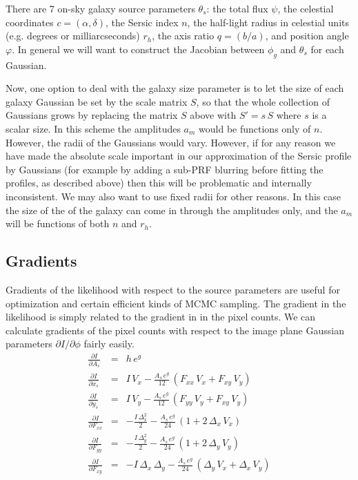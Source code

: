 \documentclass[modern]{aastex62}
\newcommand{\dx}{\Delta_x}
\newcommand{\dy}{\Delta_y}
\begin{document}
{There are 7 on-sky galaxy source parameters $\theta_s$:
the total flux $\psi$,
the celestial coordinates $c= (\alpha, \delta)$,
the Sersic index $n$, 
the half-light radius in  celestial units (e.g. degrees or milliarcseconds) $r_h$,
the axis ratio $q = (b/a)$,
and position angle $\varphi$.
In general we will want to construct the Jacobian between $\phi_g$ and $\theta_s$ for each Gaussian.

Now, one option to deal with the galaxy size parameter is to let the size of each galaxy Gaussian be set by the scale matrix $S$, so that the whole collection of Gaussians grows by replacing the matrix $S$ above with $S'=s\,S$ where $s$ is a scalar size.
In this scheme the amplitudes $a_m$ would be functions only of $n$.
However, the radii of the Gaussians would vary.
However, if for any reason we have made the absolute scale important in our approximation of the Sersic profile by Gaussians (for example by adding a sub-PRF blurring before fitting the profiles, as described above) then this will be problematic and internally inconsistent.
We may also want to use fixed radii for other reasons.
In this case the size of the of the galaxy can come in through the amplitudes only, and the $a_m$ will be functions of both $n$ and $r_h$.


\subsection{Gradients}
Gradients of the likelihood with respect to the source parameters are useful for optimization and certain efficient kinds of MCMC sampling.
The gradient in the likelihood is simply related to the gradient in in the pixel counts.
We can calculate gradients of the pixel counts with respect to the  image plane Gaussian parameters $\partial I/\partial \phi$ fairly easily.
\begin{eqnarray}
\frac{\partial I}{\partial A_s} & = & h \, e^g \\
\frac{\partial I}{\partial x_s} & = & I \, V_x - \frac{A_s \, e^g}{12} \, (F_{xx} \, V_x + F_{xy} \, V_y) \\
\frac{\partial I}{\partial y_s} & = & I \, V_y - \frac{A_s \, e^g}{12} \,  (F_{yy} \, V_y + F_{xy} \, V_y) \\
\frac{\partial I}{\partial F_{xx}} & = & - \frac{I \, \dx^2}{2} - \frac{A_s \, e^g}{24} \,  (1 + 2\, \dx \, V_x) \\
\frac{\partial I}{\partial F_{yy}} & = & - \frac{I \, \dy^2}{2} - \frac{A_s \, e^g}{24} \,  (1 + 2\, \dy \, V_y) \\
\frac{\partial I}{\partial F_{xy}} & = & - {I \, \dx\, \dy} - \frac{A_s \, e^g}{24} \,  (\dy \, V_x + \dx \, V_y)
\end{eqnarray}

}
\end{document}
